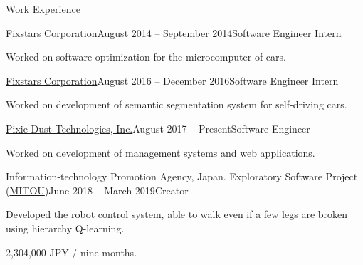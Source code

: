 \documentclass{resume} %
\begin{document}
\begin{rSection}{Work Experience}

    \begin{rSubsection}{\href{https://www.fixstars.com/en/}{Fixstars Corporation}}{August 2014 -- September 2014}{Software Engineer Intern}{}
    \item Worked on software optimization for the microcomputer of cars.
    \end{rSubsection}

    \begin{rSubsection}{\href{https://www.fixstars.com/en/}{Fixstars Corporation}}{August 2016 -- December 2016}{Software Engineer Intern}{}
    \item Worked on development of semantic segmentation system for self-driving cars.
    \end{rSubsection}

    \begin{rSubsection}{\href{http://pixiedusttech.com/}{Pixie Dust Technologies, Inc.}}{August 2017 -- Present}{Software Engineer}{}
    \item Worked on development of management systems and web applications.
    \end{rSubsection}

    \begin{rSubsection}{Information-technology Promotion Agency, Japan. Exploratory Software Project (\href{https://www.mitou.org/}{MITOU})}{June 2018 -- March 2019}{Creator}{}
    \item Developed the robot control system, able to walk even if a few legs are broken using hierarchy Q-learning.
    \item 2,304,000 JPY / nine months.
    \end{rSubsection}

\end{rSection}


\end{document}
